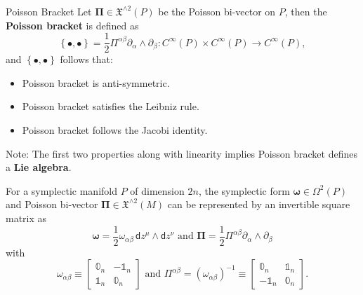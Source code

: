 \documentclass{beamer}
\begin{document}
\begin{frame}{}
  \begin{block}{Poisson Bracket}
    Let \(\boldsymbol{\Pi} \in \mathfrak{X}^{\wedge 2} (P)\) be the Poisson bi-vector on \(P\), then the \textbf{Poisson bracket} is defined as
    \begin{equation}
      \left\{ \bullet, \bullet \right\} = \frac{1}{2} \Pi ^{\alpha \beta} \partial _{\alpha} \wedge \partial _{\beta} : C ^{\infty} (P) \times C ^{\infty} (P) \to C ^{\infty} (P),
    \end{equation}
    and \(\left\{ \bullet, \bullet \right\}\) follows that:
    \begin{itemize}
      \item Poisson bracket is anti-symmetric.
      \item Poisson bracket satisfies the Leibniz rule.
      \item Poisson bracket follows the Jacobi identity.
    \end{itemize}
    Note: The first two properties along with linearity implies Poisson bracket defines a \textbf{Lie algebra}.
  \end{block}
\end{frame}

\begin{frame}{}
  \begin{example}
    For a symplectic manifold \(P\) of dimension \(2n\), the symplectic form \(\boldsymbol{\omega} \in \Omega ^{2} (P)\) and Poisson bi-vector \(\boldsymbol{\Pi} \in \mathfrak{X} ^{\wedge 2} (M)\) can be represented by an invertible square matrix as
    \begin{equation}
      \boldsymbol{\omega} = \frac{1}{2} \omega _{\alpha \beta} \, \mathsf{d} z ^{\mu} \wedge \mathsf{d} z ^{\nu} \text{ and } \boldsymbol{\Pi} = \frac{1}{2} \Pi ^{\alpha \beta} \partial _{\alpha} \wedge \partial _{\beta}
    \end{equation}
    with
    \begin{equation}
      \omega _{\alpha \beta} \equiv
      \begin{bmatrix}
        \mathbb{0} _{n} & -\mathbb{1} _{n}\\
        \mathbb{1} _{n} & \mathbb{0} _{n}
      \end{bmatrix}
      \text{ and } \Pi ^{\alpha \beta} = \left( \omega _{\alpha \beta} \right) ^{-1} \equiv
      \begin{bmatrix}
        \mathbb{0} _{n} & \mathbb{1} _{n}\\
        - \mathbb{1} _{n} & \mathbb{0} _{n}
      \end{bmatrix}.
    \end{equation}
  \end{example}
\end{frame}
\end{document}
